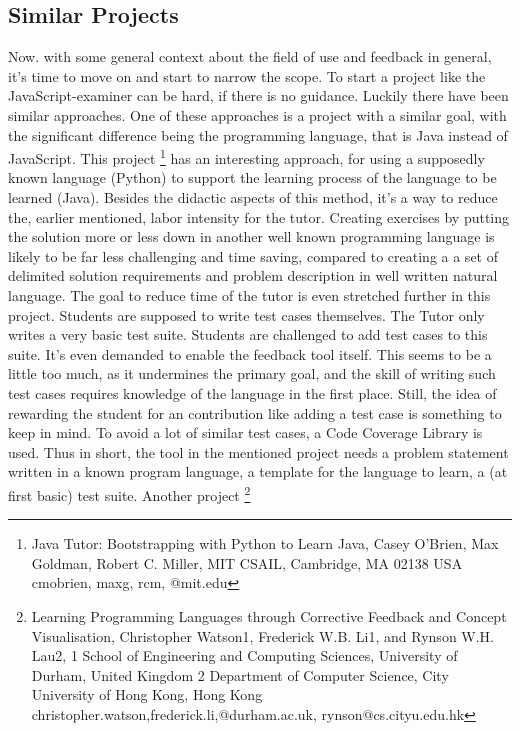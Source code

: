 \documentclass{article}
\begin{document}
\subsection{Similar Projects}
Now. with some general context about the field of use and feedback in general,
it's time to move on and
start to narrow the scope. To start a project like the JavaScript-examiner can
be hard, if there is no guidance. Luckily there have been similar approaches. 
One of these approaches is a project with a similar goal, with the significant
difference being the programming language, that is Java instead of JavaScript. 
This project \footnote{Java Tutor: 
Bootstrapping with Python to Learn Java,
Casey O’Brien, Max Goldman, Robert C. Miller,
MIT CSAIL,
Cambridge, MA 02138 USA
cmobrien, maxg, rcm, @mit.edu} has an interesting approach, for using a 
supposedly known language (Python) to support the learning process of the 
language to be learned (Java). %
Besides the didactic aspects of this method, it's a way to reduce the,
earlier mentioned, labor intensity for the tutor. Creating exercises by 
putting the solution more or less down in another well known programming 
language is likely
to be far less challenging and time saving, compared to creating a
a set of delimited solution requirements and problem description
in well written natural language. The goal to reduce time of the tutor is even
stretched further in this project. Students are supposed to write test cases 
themselves. The Tutor only writes a very basic test suite. Students are 
challenged to 
add test cases to this suite. It's even demanded to enable the feedback
tool itself. This seems to be a little too much, as it undermines the primary
goal, and the skill of writing such test cases requires knowledge of the
language in the first place. Still, the idea of rewarding the student for an
contribution like adding a test case is something to keep in mind. To avoid a 
lot of similar test cases, a Code Coverage Library is used. Thus in short, 
the tool in the mentioned project needs a problem statement written in a known
program language, a template for the language to learn, a (at first basic) 
test suite. \newline
Another project 
\footnote{Learning Programming Languages
through Corrective Feedback and Concept Visualisation,
Christopher Watson1, Frederick W.B. Li1, and Rynson W.H. Lau2,
1 School of Engineering and Computing Sciences, University of Durham, 
United Kingdom
2 Department of Computer Science, City University of Hong Kong, Hong Kong
christopher.watson,frederick.li,@durham.ac.uk,
rynson@cs.cityu.edu.hk} 
\end{document}
